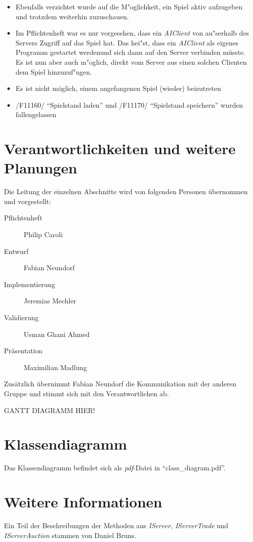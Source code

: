 \documentclass[a4paper,10pt]{article}
\begin{document}
\begin{itemize}
\item Ebenfalls verzichtet wurde auf die M"oglichkeit, ein Spiel aktiv aufzugeben und trotzdem weiterhin zuzuschauen.
\item Im Pflichtenheft war es nur vorgesehen, dass ein \textit{AIClient} von au"serhalb des Servers Zugriff auf das Spiel hat. Das hei"st, dass ein \textit{AIClient} als eigenes Programm gestartet werdenund sich dann auf den Server verbinden müsste. Es ist nun aber auch m"oglich, direkt vom Server aus einen solchen Clienten dem Spiel hinzuzuf"ugen.
\item Es ist nicht möglich, einem angefangenen Spiel (wieder) beizutreten
\item /F11160/ "`Spielstand laden"' und /F11170/ "`Spielstand speichern"' wurden fallengelassen 
\end{itemize}
\section{Verantwortlichkeiten und weitere Planungen}
Die Leitung der einzelnen Abschnitte wird von folgenden Personen übernommen und vorgestellt:
\begin{description}
\item[Pflichtenheft] Philip Caroli
\item[Entwurf] Fabian Neundorf
\item[Implementierung] Jeremias Mechler
\item[Validierung] Usman Ghani Ahmed
\item[Präsentation] Maximilian Madlung
\end{description}
Zusätzlich übernimmt Fabian Neundorf die Kommunikation mit der anderen Gruppe und stimmt sich mit den Verantwortlichen ab.

GANTT DIAGRAMM HIER!
\section{Klassendiagramm}
Das Klassendiagramm befindet sich als \textit{pdf}-Datei in "`class\_diagram.pdf"'.
\section{Weitere Informationen}
Ein Teil der Beschreibungen der Methoden aus \textit{IServer, IServerTrade} und \textit{IServerAuction} stammen von Daniel Bruns.
\end{document}
